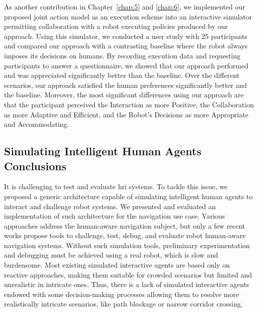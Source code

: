 As another contribution in Chapter~\ref{chap:5} and \ref{chap:6}, 
we implemented our proposed joint action model as an execution scheme into an interactive simulator permitting collaboration with a robot executing policies produced by our approach. 
Using this simulator, we conducted a user study with 25 participants and compared our approach with a contrasting baseline where the robot always imposes its decisions on humans. By recording execution data and requesting participants to answer a questionnaire, we showed that our approach performed and was appreciated significantly better than the baseline. Over the different scenarios, our approach satisfied the human preferences significantly better and the baseline. 
Moreover, the most significant differences using our approach are that the participant perceived the Interaction as more Positive, the Collaboration as more Adaptive and Efficient, and the Robot's Decisions as more Appropriate and Accommodating.    

\subsection*{Simulating Intelligent Human Agents Conclusions}

It is challenging to test and evaluate \acrshort{hri} systems. To tackle this issue, we proposed a generic architecture capable of simulating intelligent human agents to interact and challenge robot systems. We presented and evaluated an implementation of such architecture for the navigation use case. Various approaches address the human-aware navigation subject, but only a few recent works propose tools to challenge, test, debug, and evaluate robot human-aware navigation systems. Without such simulation tools, preliminary experimentation and debugging must be achieved using a real robot, which is slow and burdensome. 
Most existing simulated interactive agents are based only on reactive approaches, making them suitable for crowded scenarios but limited and unrealistic in intricate ones. 
Thus, there is a lack of simulated interactive agents endowed with some decision-making processes allowing them to resolve more realistically intricate scenarios, like path blockage or narrow corridor crossing.

